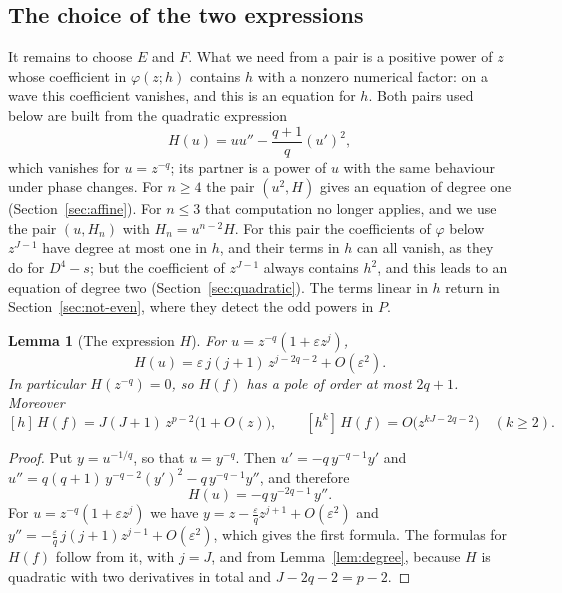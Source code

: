 \documentclass[11pt]{article}
\newtheorem{lemma}[theorem]{Lemma}
\theoremstyle{definition}
\theoremstyle{remark}
\numberwithin{equation}{section}
\begin{document}
\subsection{The choice of the two expressions}\label{sec:choice}

It remains to choose \(E\) and \(F\). What we need from a pair is a
positive power of \(z\) whose coefficient in \(\varphi(z;h)\) contains
\(h\) with a nonzero numerical factor: on a wave this coefficient
vanishes, and this is an equation for \(h\). Both pairs
used below are built from the quadratic expression
\begin{equation}\label{eq:seed}
 H(u)=uu''-\frac{q+1}{q}(u')^2 ,
\end{equation}
which vanishes for \(u=z^{-q}\); its partner is a power of \(u\) with
the same behaviour under phase changes. For \(n\ge4\) the pair
\((u^2,H)\) gives an equation of degree one
(Section~\ref{sec:affine}). For \(n\le3\) that computation no longer
applies, and we use the pair \((u,H_n)\) with \(H_n=u^{n-2}H\). For this
pair the coefficients of \(\varphi\) below \(z^{J-1}\) have degree at
most one in \(h\), and their terms in \(h\) can all vanish, as they do
for \(D^4-s\); but the coefficient of \(z^{J-1}\) always contains
\(h^2\), and this leads to an equation of degree two
(Section~\ref{sec:quadratic}). The terms linear in \(h\) return in
Section~\ref{sec:not-even}, where they detect the odd powers in \(P\).

\begin{lemma}[The expression \(H\)]\label{lem:seed}
For \(u=z^{-q}(1+\varepsilon z^j)\),
\[
 H(u)=\varepsilon\,j(j+1)\,z^{j-2q-2}+O(\varepsilon^2).
\]
In particular \(H(z^{-q})=0\), so \(H(f)\) has a pole of order at most
\(2q+1\). Moreover
\[
 [h]\,H(f)=J(J+1)\,z^{p-2}\bigl(1+O(z)\bigr),\qquad
 [h^k]\,H(f)=O\bigl(z^{kJ-2q-2}\bigr)\quad(k\ge2).
\]
\end{lemma}

\begin{proof}
Put \(y=u^{-1/q}\), so that \(u=y^{-q}\). Then
\(u'=-q\,y^{-q-1}y'\) and
\(u''=q(q+1)\,y^{-q-2}(y')^2-q\,y^{-q-1}y''\), and therefore
\begin{equation}\label{eq:seed-y}
 H(u)=-q\,y^{-2q-1}\,y'' .
\end{equation}
For \(u=z^{-q}(1+\varepsilon z^j)\) we have
\(y=z-\tfrac{\varepsilon}{q}z^{j+1}+O(\varepsilon^2)\) and
\(y''=-\tfrac{\varepsilon}{q}\,j(j+1)z^{j-1}+O(\varepsilon^2)\), which
gives the first formula. The formulas for \(H(f)\) follow from it, with
\(j=J\), and from Lemma~\ref{lem:degree}, because \(H\) is quadratic
with two derivatives in total and \(J-2q-2=p-2\).
\end{proof}
\end{document}
